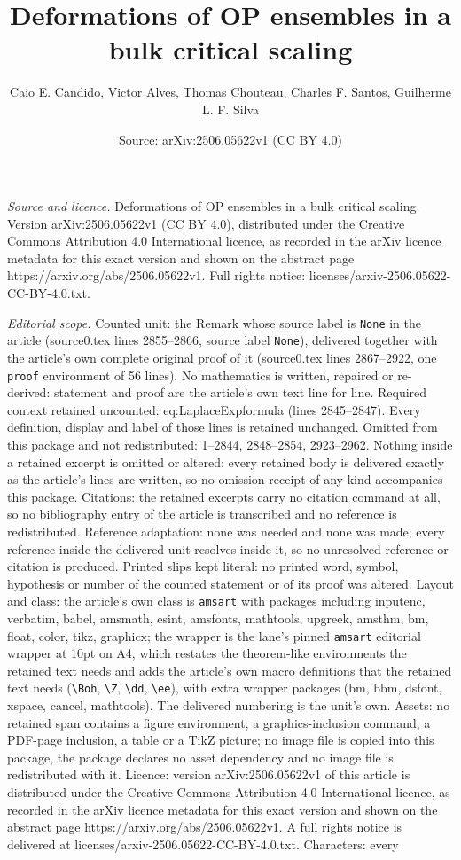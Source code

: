 \documentclass[10pt,a4paper]{amsart}
\title[Deformations of OP ensembles in a bulk critical scaling]{Deformations of OP ensembles in a bulk critical scaling}
\author{Caio E. Candido, Victor Alves, Thomas Chouteau, Charles F. Santos, Guilherme L. F. Silva}
\date{Source: arXiv:2506.05622v1 (CC BY 4.0)}
\begin{document}
\maketitle

\noindent\emph{Source and licence.} Deformations of OP ensembles in a bulk critical scaling. Version arXiv:2506.05622v1 (CC BY 4.0), distributed under the Creative Commons Attribution 4.0 International licence, as recorded in the arXiv licence metadata for this exact version and shown on the abstract page https://arxiv.org/abs/2506.05622v1. Full rights notice: licenses/arxiv-2506.05622-CC-BY-4.0.txt.\par\smallskip

\noindent\textit{Editorial scope.} Counted unit: the Remark whose source label is \texttt{None} in the article (source0.tex lines 2855--2866, source label \texttt{None}), delivered together with the article's own complete original proof of it (source0.tex lines 2867--2922, one \texttt{proof} environment of 56 lines). No mathematics is written, repaired or re-derived: statement and proof are the article's own text line for line. Required context retained uncounted: eq:LaplaceExpformula (lines 2845--2847). Every definition, display and label of those lines is retained unchanged. Omitted from this package and not redistributed: 1--2844, 2848--2854, 2923--2962. Nothing inside a retained excerpt is omitted or altered: every retained body is delivered exactly as the article's lines are written, so no omission receipt of any kind accompanies this package. Citations: the retained excerpts carry no citation command at all, so no bibliography entry of the article is transcribed and no reference is redistributed. Reference adaptation: none was needed and none was made; every reference inside the delivered unit resolves inside it, so no unresolved reference or citation is produced. Printed slips kept literal: no printed word, symbol, hypothesis or number of the counted statement or of its proof was altered. Layout and class: the article's own class is \texttt{amsart} with packages including inputenc, verbatim, babel, amsmath, esint, amsfonts, mathtools, upgreek, amsthm, bm, float, color, tikz, graphicx; the wrapper is the lane's pinned \texttt{amsart} editorial wrapper at 10pt on A4, which restates the theorem-like environments the retained text needs and adds the article's own macro definitions that the retained text needs (\texttt{\textbackslash Boh}, \texttt{\textbackslash Z}, \texttt{\textbackslash dd}, \texttt{\textbackslash ee}), with extra wrapper packages (bm, bbm, dsfont, xspace, cancel, mathtools). The delivered numbering is the unit's own. Assets: no retained span contains a figure environment, a graphics-inclusion command, a PDF-page inclusion, a table or a TikZ picture; no image file is copied into this package, the package declares no asset dependency and no image file is redistributed with it. Licence: version arXiv:2506.05622v1 of this article is distributed under the Creative Commons Attribution 4.0 International licence, as recorded in the arXiv licence metadata for this exact version and shown on the abstract page https://arxiv.org/abs/2506.05622v1. A full rights notice is delivered at licenses/arxiv-2506.05622-CC-BY-4.0.txt. Characters: every 
\end{document}
